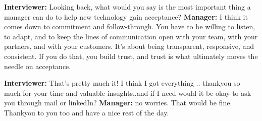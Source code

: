 \textbf{Interviewer:} Looking back, what would you say is the most important thing a manager can do to help new technology gain acceptance? \newline
\textbf{Manager:} I think it comes down to commitment and follow-through. You have to be willing to listen, to adapt, and to keep the lines of communication open with your team, with your partners, and with your customers. It's about being transparent, responsive, and consistent. If you do that, you build trust, and trust is what ultimately moves the needle on acceptance. \newline

\textbf{Interviewer:} That's pretty much it! I think I got everything .. thankyou so much for your time and valuable insughts..and if I need would it be okay to ask you through mail or linkedIn? \newline
\textbf{Manager:} no worries. That would be fine. Thankyou to you too and have a nice rest of the day.  \newline

